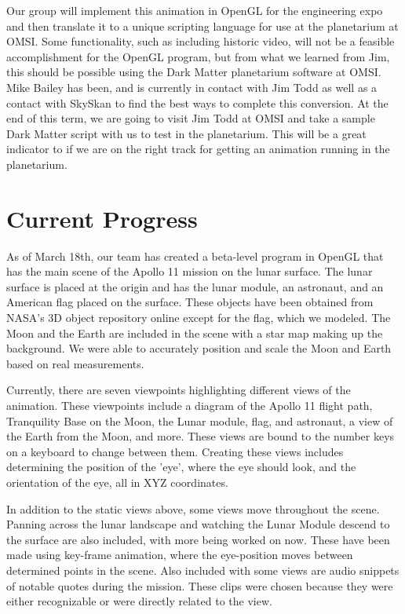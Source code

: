 \documentclass[onecolumn, draftclsnofoot,10pt, compsoc]{IEEEtran}
\begin{document}
Our group will implement this animation in OpenGL for the engineering expo and then translate it to a unique scripting language for use at the planetarium at OMSI. Some functionality, such as including historic video, will not be a feasible accomplishment for the OpenGL program, but from what we learned from Jim, this should be possible using the Dark Matter planetarium software at OMSI. Mike Bailey has been, and is currently in contact with Jim Todd as well as a contact with SkySkan to find the best ways to complete this conversion. At the end of this term, we are going to visit Jim Todd at OMSI and take a sample Dark Matter script with us to test in the planetarium. This will be a great indicator to if we are on the right track for getting an animation running in the planetarium. 

\section{Current Progress}

As of March 18th, our team has created a beta-level program in OpenGL that has the main scene of the Apollo 11 mission on the lunar surface. The lunar surface is placed at the origin and has the lunar module, an astronaut, and an American flag placed on the surface. These objects have been obtained from NASA's 3D object repository online except for the flag, which we modeled. The Moon and the Earth are included in the scene with a star map making up the background. We were able to accurately position and scale the Moon and Earth based on real measurements. 

Currently, there are seven viewpoints highlighting different views of the animation. These viewpoints include a diagram of the Apollo 11 flight path, Tranquility Base on the Moon, the Lunar module, flag, and astronaut, a view of the Earth from the Moon, and more. These views are bound to the number keys on a keyboard to change between them. Creating these views includes determining the position of the 'eye', where the eye should look, and the orientation of the eye, all in XYZ coordinates. 

In addition to the static views above, some views move throughout the scene. Panning across the lunar landscape and watching the Lunar Module descend to the surface are also included, with more being worked on now. These have been made using key-frame animation, where the eye-position moves between determined points in the scene. Also included with some views are audio snippets of notable quotes during the mission. These clips were chosen because they were either recognizable or were directly related to the view. 
\end{document}
